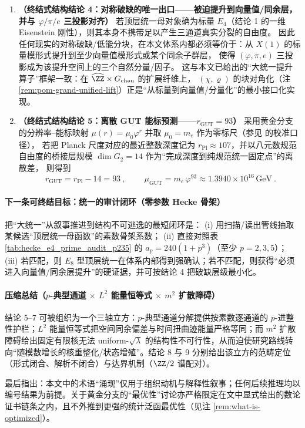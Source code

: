 \begin{enumerate}
  \item \textbf{（终结式结构结论 4：对称破缺的唯一出口——被迫提升到向量值/同余层，并与 \texorpdfstring{$\varphi/\pi/e$}{phi/pi/e} 三投影对齐）}
  若顶层统一母对象确为标量 \(E_4\)（结论 1 的一维 Eisenstein 刚性），则其本身不携带足以产生三通道真实分裂的自由度。
  因此任何现实的对称破缺/低能分块，在本文体系内都必须等价于：从 \(X(1)\) 的标量模形式提升到至少向量值模形式或某个同余子群层，
  使得 \((\varphi,\pi,e)\) 三投影成为该提升空间上的三个自然分量/因子。
  这与本文已给出的“大统一提升算子”框架一致：在 \(\widehat{\ZZ}\times G_{\mathrm{chan}}\) 的扩展纤维上，
  \((\chi,\varrho)\) 的块对角化（注 \ref{rem:pom-grand-unified-lift}）正是“从标量到向量值/分量化”的最小接口化实现。

  \item \textbf{（终结式结构结论 5：离散 GUT 能标预测——\texorpdfstring{$r_{\mathrm{GUT}}=93$}{r_GUT=93}）}
  采用黄金分支的分辨率--能标映射 \(\mu(r)=\mu_0\varphi^{r}\) 并取 \(\mu_0=m_e\) 作为零标尺（参见 \cite{Internal2025PhysicalConstantsGeometry} 的校准口径），
  若把 Planck 尺度对应的最近整数深度记为 \(r_{\mathrm{Pl}}\approx 107\)，并以八元数规范自由度的桥接层规模 \(\dim G_2=14\) 作为“完成深度到纯规范统一固定点”的离散差，
  则得到
  \[
  \boxed{\ r_{\mathrm{GUT}}=r_{\mathrm{Pl}}-14=93\ },
  \qquad
  \boxed{\ \mu_{\mathrm{GUT}}=m_e\,\varphi^{93}\approx 1.3940\times 10^{16}\,\mathrm{GeV}\ }.
  \]
\end{enumerate}

\paragraph{下一条可终结目标：统一的审计闭环（零参数 Hecke 骨架）}
把“大统一”从叙事推进到结构不可逃逸的最短闭环是：
(i) 用扫描/读出管线抽取某候选“顶层统一母函数”的素数骨架系数；
(ii) 直接对照表 \ref{tab:hecke_e4_prime_audit_p235} 的 \(a_p=240(1+p^3)\)（至少 \(p=2,3,5\)）；
(iii) 若匹配，则 \(E_8\) 型顶层统一在体系内部得到强确认；若不匹配，则获得“必须进入向量值/同余层提升”的硬证据，并可按结论 4 把破缺层级最小化。

\paragraph{压缩总结（\texorpdfstring{$p$}{p}-典型通道 \(\times\) \texorpdfstring{$L^2$}{L2} 能量恒等式 \(\times\) \texorpdfstring{$m^2$}{m^2} 扩散障碍）}
结论 5--7 可被组织为一个三轴立方：\(p\)-典型通道分解提供按素数逐通道的 \(p\)-进整性护栏；\(L^2\) 能量恒等式把空间同余偏差与时间扭曲迹能量严格等同；而 \(m^2\) 扩散障碍给出固定有限核无法 uniform-\(\sqrt{\lambda}\) 的结构性不可行性，从而迫使研究路线转向“随模数增长的核重整化/状态增殖”。结论 8 与 9 分别给出该立方的范畴定位（形式闭合、解析不闭合）与达界机制（\(\ZZ/2\) 谱配对）。

最后指出：本文中的术语“涌现”仅用于组织动机与解释性叙事；任何后续推理均以编号结果为前提。关于黄金分支的“最优性”讨论亦严格限定在文中显式给出的数论证书链条之内，且不外推到更强的统计泛函最优性（见注 \ref{rem:what-is-optimized}）。
